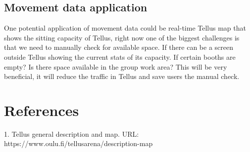 \documentclass{article}
\begin{document}
\subsection{Movement data application}

One potential application of movement data could be real-time Tellus map that shows the sitting
capacity of Tellus, right now one of the biggest challenges is that we need to manually check for
available space. If there can be a screen outside Tellus showing the current stats of its capacity.
If certain booths are empty? Is there space available in the group work area? This will be very
beneficial, it will reduce the traffic in Tellus and save users the manual check.


\section{References}

1. Tellus general description and map. URL: https://www.oulu.fi/tellusarena/description-map
\end{document}
